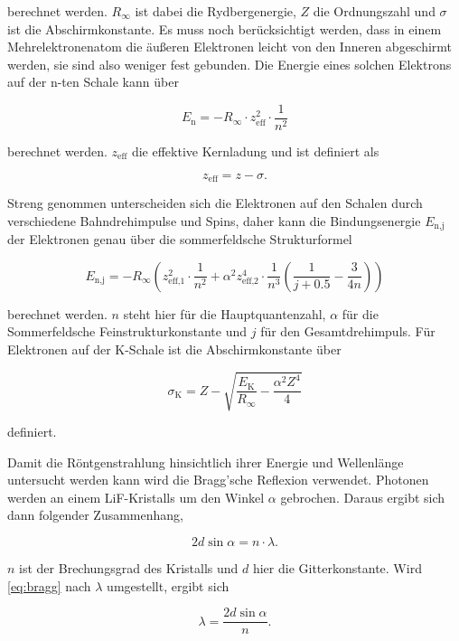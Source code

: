 berechnet werden.
$R_\infty$ ist dabei die Rydbergenergie, $Z$ die Ordnungszahl und $\sigma$ ist die Abschirmkonstante.
Es muss noch berücksichtigt werden, dass in einem Mehrelektronenatom die äußeren Elektronen leicht von den Inneren abgeschirmt werden, sie sind also weniger fest gebunden.
Die Energie eines solchen Elektrons auf der n-ten Schale kann über 

\begin{equation}
    E_\text{n} = - R_\infty \cdot z_\text{eff}^2 \cdot \frac{1}{n^2}
    \label{eq:en}
\end{equation}

berechnet werden.
$z_\text{eff}$ die effektive Kernladung und ist definiert als

\begin{equation}
    z_\text{eff} = z - \sigma.
    \label{eq:z}
\end{equation}

Streng genommen unterscheiden sich die Elektronen auf den Schalen durch verschiedene Bahndrehimpulse und Spins, daher kann die Bindungsenergie $E_\text{n,j}$ der Elektronen genau über die sommerfeldsche Strukturformel

\begin{equation}
    E_\text{n,j} = - R_\infty \left(z_\text{eff,1}^2 \cdot \frac{1}{n^2} + \alpha ^2 z_\text{eff,2}^4  \cdot \frac{1}{n^3} \left(\frac{1}{j + 0.5} - \frac{3}{4 n}   \right)\right)
    \label{eq:sommerfeld}
\end{equation}

berechnet werden.
$n$ steht hier für die Hauptquantenzahl, $\alpha$ für die Sommerfeldsche Feinstrukturkonstante und $j$ für den Gesamtdrehimpuls.
Für Elektronen auf der K-Schale ist die Abschirmkonstante über 

\begin{equation}
    \sigma _\text{K} = Z - \sqrt{\frac{E_\text{K}}{R_\infty} - \frac{\alpha ^2 Z^4}{4}}
    \label{eq:sigma}
\end{equation}

definiert.

Damit die Röntgenstrahlung hinsichtlich ihrer Energie und Wellenlänge untersucht werden kann wird die Bragg'sche Reflexion verwendet.
Photonen werden an einem LiF-Kristalls um den Winkel $\alpha$ gebrochen.
Daraus ergibt sich dann folgender Zusammenhang,

\begin{equation}
    2 d \sin{\alpha} = n \cdot \lambda.
    \label{eq:bragg}
\end{equation}

$n$ ist der Brechungsgrad des Kristalls und $d$ hier die Gitterkonstante.
Wird \eqref{eq:bragg} nach $\lambda$ umgestellt, ergibt sich 

\begin{equation}
   \lambda = \frac{2 d \sin{\alpha}}{n}.
   \label{eq:lambda}
\end{equation}